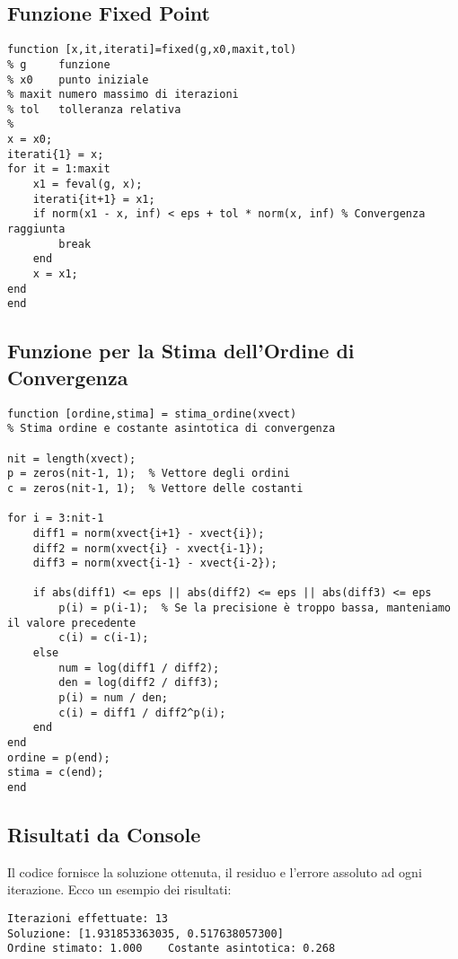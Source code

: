 \documentclass[11pt]{article}
\begin{document}
\subsection*{Funzione Fixed Point}

\begin{lstlisting}
function [x,it,iterati]=fixed(g,x0,maxit,tol)
% g     funzione
% x0    punto iniziale
% maxit numero massimo di iterazioni
% tol   tolleranza relativa
%
x = x0;
iterati{1} = x;
for it = 1:maxit
    x1 = feval(g, x);
    iterati{it+1} = x1;
    if norm(x1 - x, inf) < eps + tol * norm(x, inf) % Convergenza raggiunta
        break
    end
    x = x1;  
end
end
\end{lstlisting}

\subsection*{Funzione per la Stima dell'Ordine di Convergenza}

\begin{lstlisting}
function [ordine,stima] = stima_ordine(xvect)
% Stima ordine e costante asintotica di convergenza

nit = length(xvect);
p = zeros(nit-1, 1);  % Vettore degli ordini
c = zeros(nit-1, 1);  % Vettore delle costanti

for i = 3:nit-1
    diff1 = norm(xvect{i+1} - xvect{i});
    diff2 = norm(xvect{i} - xvect{i-1});
    diff3 = norm(xvect{i-1} - xvect{i-2});

    if abs(diff1) <= eps || abs(diff2) <= eps || abs(diff3) <= eps
        p(i) = p(i-1);  % Se la precisione è troppo bassa, manteniamo il valore precedente
        c(i) = c(i-1);
    else
        num = log(diff1 / diff2);
        den = log(diff2 / diff3);
        p(i) = num / den;
        c(i) = diff1 / diff2^p(i);
    end
end
ordine = p(end);
stima = c(end);
end
\end{lstlisting}

\subsection*{Risultati da Console}

Il codice fornisce la soluzione ottenuta, il residuo e l'errore assoluto ad ogni iterazione. Ecco un esempio dei risultati:
\begin{lstlisting}[style=console]
Iterazioni effettuate: 13 	 
Soluzione: [1.931853363035, 0.517638057300]
Ordine stimato: 1.000 	 Costante asintotica: 0.268
\end{lstlisting}
\end{document}
